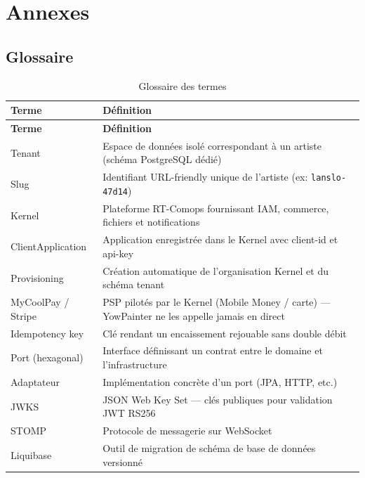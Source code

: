 \chapter{Annexes}

\section{Glossaire}

\begin{longtable}{@{}p{3.5cm}p{10cm}@{}}
  \caption{Glossaire des termes} \label{tab:glossaire} \\
  \toprule
  \textbf{Terme} & \textbf{Définition} \\
  \midrule
  \endfirsthead
  \toprule
  \textbf{Terme} & \textbf{Définition} \\
  \midrule
  \endhead
  Tenant & Espace de données isolé correspondant à un artiste (schéma PostgreSQL dédié) \\
  Slug & Identifiant URL-friendly unique de l'artiste (ex: \texttt{lanslo-47d14}) \\
  Kernel & Plateforme RT-Comops fournissant IAM, commerce, fichiers et notifications \\
  ClientApplication & Application enregistrée dans le Kernel avec client-id et api-key \\
  Provisioning & Création automatique de l'organisation Kernel et du schéma tenant \\
  MyCoolPay / Stripe & PSP pilotés par le Kernel (Mobile Money / carte) — YowPainter ne les appelle jamais en direct \\
  Idempotency key & Clé rendant un encaissement rejouable sans double débit \\
  Port (hexagonal) & Interface définissant un contrat entre le domaine et l'infrastructure \\
  Adaptateur & Implémentation concrète d'un port (JPA, HTTP, etc.) \\
  JWKS & JSON Web Key Set — clés publiques pour validation JWT RS256 \\
  STOMP & Protocole de messagerie sur WebSocket \\
  Liquibase & Outil de migration de schéma de base de données versionné \\
  \bottomrule
\end{longtable}

